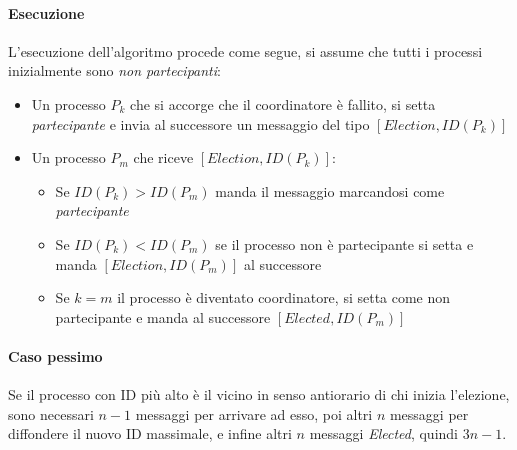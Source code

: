 \paragraph{Esecuzione}
L'esecuzione dell'algoritmo procede come segue, si assume che 
tutti i processi inizialmente sono \emph{non partecipanti}:
\begin{itemize}
    \item Un processo $P_k$ che si accorge che il coordinatore è fallito, 
    si setta \emph{partecipante} e invia al successore un messaggio 
    del tipo $[\mathit{Election}, \mathit{ID}(P_k)]$
    \item Un processo $P_m$ che riceve $[\mathit{Election}, \mathit{ID}(P_k)]$:
    \begin{itemize}
        \item Se $\mathit{ID}(P_k) > \mathit{ID}(P_m)$ manda il messaggio 
        marcandosi come \emph{partecipante}
        \item Se $\mathit{ID}(P_k) < \mathit{ID}(P_m)$ se il processo 
        non è partecipante si setta e manda $[\mathit{Election}, \mathit{ID}(P_m)]$
        al successore
        \item Se $k = m$ il processo è diventato coordinatore, si setta 
        come non partecipante e manda al successore $[\mathit{Elected}, \mathit{ID}(P_m)]$
    \end{itemize}
\end{itemize}

\paragraph{Caso pessimo}
Se il processo con ID più alto è il vicino in senso antiorario 
di chi inizia l'elezione, sono necessari $n-1$ messaggi per arrivare ad esso, 
poi altri $n$ messaggi per diffondere il nuovo ID massimale, 
e infine altri $n$ messaggi \emph{Elected}, quindi $3n-1$.